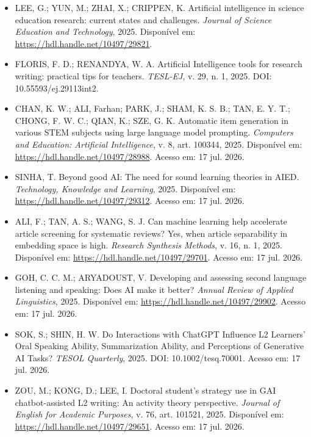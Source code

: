 \documentclass[english]{textolivre}
\begin{document}
\begin{itemize}
\item[] LEE, G.; YUN, M.; ZHAI, X.; CRIPPEN, K. Artificial intelligence in science education research: current states and challenges. \textit{Journal of Science Education and Technology}, 2025. Disponível em: \url{https://hdl.handle.net/10497/29821}.

\item[] FLORIS, F. D.; RENANDYA, W. A. Artificial Intelligence tools for research writing: practical tips for teachers. \textit{TESL-EJ}, v. 29, n. 1, 2025. DOI: 10.55593/ej.29113int2.

\item[] CHAN, K. W.; ALI, Farhan; PARK, J.; SHAM, K. S. B.; TAN, E. Y. T.; CHONG, F. W. C.; QIAN, K.; SZE, G. K. Automatic item generation in various STEM subjects using large language model prompting. \textit{Computers and Education: Artificial Intelligence}, v. 8, art. 100344, 2025. Disponível em: \url{https://hdl.handle.net/10497/28988}. Acesso em: 17 jul. 2026.

\item[] SINHA, T. Beyond good AI: The need for sound learning theories in AIED. \textit{Technology, Knowledge and Learning}, 2025. Disponível em: \url{https://hdl.handle.net/10497/29312}. Acesso em: 17 jul. 2026.

\item[] ALI, F.; TAN, A. S.; WANG, S. J. Can machine learning help accelerate article screening for systematic reviews? Yes, when article separability in embedding space is high. \textit{Research Synthesis Methods}, v. 16, n. 1, 2025. Disponível em: \url{https://hdl.handle.net/10497/29701}. Acesso em: 17 jul. 2026.

\item[] GOH, C. C. M.; ARYADOUST, V. Developing and assessing second language listening and speaking: Does AI make it better? \textit{Annual Review of Applied Linguistics}, 2025. Disponível em: \url{https://hdl.handle.net/10497/29902}. Acesso em: 17 jul. 2026.

\item[] SOK, S.; SHIN, H. W. Do Interactions with ChatGPT Influence L2 Learners' Oral Speaking Ability, Summarization Ability, and Perceptions of Generative AI Tasks? \textit{TESOL Quarterly}, 2025. DOI: 10.1002/tesq.70001. Acesso em: 17 jul. 2026.

\item[] ZOU, M.; KONG, D.; LEE, I. Doctoral student's strategy use in GAI chatbot-assisted L2 writing: An activity theory perspective. \textit{Journal of English for Academic Purposes}, v. 76, art. 101521, 2025. Disponível em: \url{https://hdl.handle.net/10497/29651}. Acesso em: 17 jul. 2026.


\end{itemize}
\end{document}
